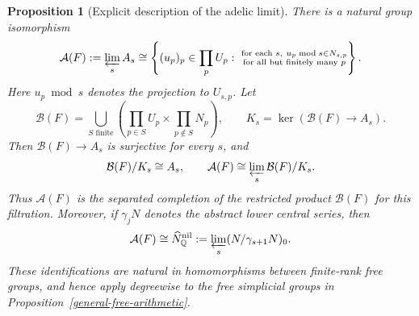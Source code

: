 \documentclass[11pt,a4paper]{article}
\newtheorem{proposition}[theorem]{Proposition}
\begin{document}
\begin{proposition}[Explicit description of the adelic limit]
\label{adelic-completion-description}
There is a natural group isomorphism
\begin{equation}\label{adelic-coordinate-description}
 \mathcal A(F):=\varprojlim_s A_s
 \cong\left\{(u_p)_p\in\prod_pU_p:\ 
 \substack{\text{for each }s,\ u_p\bmod s\in N_{s,p}\\
 \text{for all but finitely many }p}\right\}.
\end{equation}
Here $u_p\bmod s$ denotes the projection to $U_{s,p}$.
Let
\[
 \mathcal B(F)=\bigcup_{S\text{ finite}}
 \left(\prod_{p\in S}U_p\times\prod_{p\notin S}N_p\right),
 \qquad K_s=\ker(\mathcal B(F)\longrightarrow A_s).
\]
Then $\mathcal B(F)\to A_s$ is surjective for every $s$, and
\begin{equation}\label{adelic-restricted-completion}
 \mathcal B(F)/K_s\cong A_s,\qquad
 \mathcal A(F)\cong\varprojlim_s\mathcal B(F)/K_s.
\end{equation}
Thus $\mathcal A(F)$ is the separated completion of the restricted
product $\mathcal B(F)$ for this filtration.
Moreover, if $\gamma_jN$ denotes the \emph{abstract} lower central series,
then
\begin{equation}\label{adelic-rational-completion}
 \mathcal A(F)\cong\widehat N_{\mathbb Q}^{\mathrm{nil}}
 :=\varprojlim_s(N/\gamma_{s+1}N)_0.
\end{equation}
These identifications are natural in homomorphisms between finite-rank
free groups, and hence apply degreewise to the free simplicial groups
in Proposition~\ref{general-free-arithmetic}.
\end{proposition}
\end{document}
